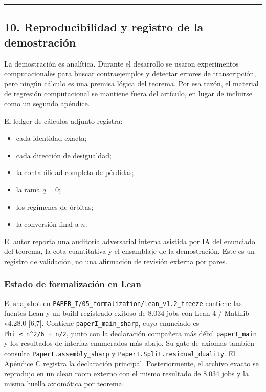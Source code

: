 \documentclass[
  spanish,
  11pt,
  a4paper,
]{article}
\providecommand{\tightlist}{%
  \setlength{\itemsep}{0pt}\setlength{\parskip}{0pt}}
\begin{document}
\begin{center}\rule{0.5\linewidth}{0.5pt}\end{center}

\subsection{10. Reproducibilidad y registro de la demostración}\label{reproducibilidad-y-registro-de-la-demostraciuxf3n}

La demostración es analítica. Durante el desarrollo se usaron experimentos computacionales para buscar contraejemplos y detectar errores de transcripción, pero ningún cálculo es una premisa lógica del teorema. Por esa razón, el material de regresión computacional se mantiene fuera del artículo, en lugar de incluirse como un segundo apéndice.

El ledger de cálculos adjunto registra:

\begin{itemize}
\tightlist
\item
  cada identidad exacta;
\item
  cada dirección de desigualdad;
\item
  la contabilidad completa de pérdidas;
\item
  la rama \(q=0\);
\item
  los regímenes de órbitas;
\item
  la conversión final a \(n\).
\end{itemize}

El autor reporta una auditoría adversarial interna asistida por IA del enunciado del teorema, la cota cuantitativa y el ensamblaje de la demostración. Este es un registro de validación, no una afirmación de revisión externa por pares.

\subsubsection{Estado de formalización en Lean}\label{estado-de-formalizaciuxf3n-en-lean}

El snapshot en \texttt{PAPER\_I/05\_formalization/lean\_v1.2\_freeze} contiene las fuentes Lean y un build registrado exitoso de 8.034 jobs con Lean 4 / Mathlib v4.28.0 {[}6,7{]}. Contiene \texttt{paperI\_main\_sharp}, cuyo enunciado es \texttt{Phi\ ≤\ n\^{}2/6\ +\ n/2}, junto con la declaración compañera más débil \texttt{paperI\_main} y los resultados de interfaz enumerados más abajo. Su gate de axiomas también consulta \texttt{PaperI.assembly\_sharp} y \texttt{PaperI.Split.residual\_duality}. El Apéndice C registra la declaración principal. Posteriormente, el archivo exacto se reprodujo en un clean room externo con el mismo resultado de 8.034 jobs y la misma huella axiomática por teorema.
\end{document}
